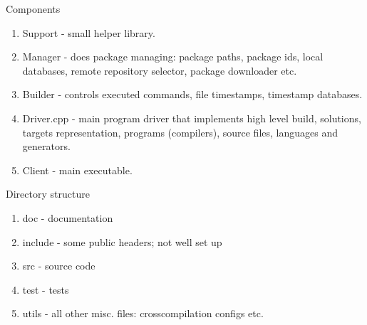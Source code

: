 Components

\begin{enumerate}
\item
Support - small helper library.
\item
Manager - does package managing: package paths, package ids, local databases, remote repository selector, package downloader etc.
\item
Builder - controls executed commands, file timestamps, timestamp databases.
\item
Driver.cpp - main program driver that implements high level build, solutions, targets representation, programs (compilers), source files, languages and generators.
\item
Client - main executable.
\end{enumerate}

Directory structure

\begin{enumerate}
\item
doc - documentation
\item
include - some public headers; not well set up
\item
src - source code
\item
test - tests
\item
utils - all other misc. files: crosscompilation configs etc.
\end{enumerate}

